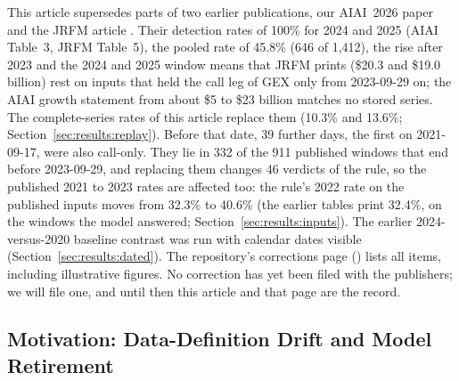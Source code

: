 This article supersedes parts of two earlier publications, our AIAI~2026 paper \cite{regan2026regimes} and the JRFM article \cite{regan2026jrfm}. Their detection rates of 100\% for 2024 and 2025 (AIAI Table~3, JRFM Table~5), the pooled rate of 45.8\% (646 of 1{,}412), the rise after 2023 and the 2024 and 2025 window means that JRFM prints (\$20.3 and \$19.0 billion) rest on inputs that held the call leg of GEX only from 2023-09-29 on; the AIAI growth statement from about \$5 to \$23 billion matches no stored series. The complete-series rates of this article replace them (10.3\% and 13.6\%; Section~\ref{sec:results:replay}). Before that date, 39 further days, the first on 2021-09-17, were also call-only. They lie in 332 of the 911 published windows that end before 2023-09-29, and replacing them changes 46 verdicts of the rule, so the published 2021 to 2023 rates are affected too: the rule's 2022 rate on the published inputs moves from 32.3\% to 40.6\% (the earlier tables print 32.4\%, on the windows the model answered; Section~\ref{sec:results:inputs}). The earlier 2024-versus-2020 baseline contrast was run with calendar dates visible (Section~\ref{sec:results:dated}). The repository's corrections page () lists all items, including illustrative figures. No correction has yet been filed with the publishers; we will file one, and until then this article and that page are the record.

\subsection{Motivation: Data-Definition Drift and Model Retirement}
\label{sec:introduction:motivation}

